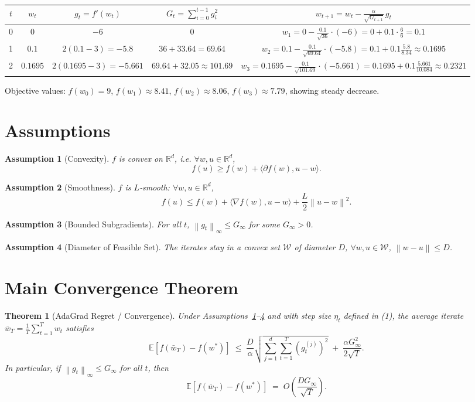 \documentclass[11pt]{article}
\newtheorem{theorem}{Theorem}
\newtheorem{assumption}{Assumption}
\newcommand{\E}{\mathbb{E}}
\newcommand{\R}{\mathbb{R}}
\newcommand{\norm}[1]{\left\| #1 \right\|}
\newcommand{\inner}[2]{\langle #1,#2\rangle}
\begin{document}
\begin{center}
\begin{tabular}{c|c|c|c|c}
$t$ & $w_{t}$ & $g_{t}=f'(w_{t})$ & $G_{t}= \sum_{i=0}^{t-1} g_{i}^{2}$ & $w_{t+1}=w_{t}-\frac{\alpha}{\sqrt{G_{t+1}}}\,g_{t}$\\ \hline
0 & $0$ & $-6$ & $0$ & $w_{1}=0-\frac{0.1}{\sqrt{36}}\cdot(-6)=0+0.1\cdot\frac{6}{6}=0.1$\\
1 & $0.1$ & $2(0.1-3)=-5.8$ & $36+33.64=69.64$ & $w_{2}=0.1-\frac{0.1}{\sqrt{69.64}}\cdot(-5.8)
      =0.1+0.1\frac{5.8}{8.34}\approx0.1695$\\
2 & $0.1695$ & $2(0.1695-3)=-5.661$ & $69.64+32.05\approx101.69$ &
 $w_{3}=0.1695-\frac{0.1}{\sqrt{101.69}}\cdot(-5.661)
      =0.1695+0.1\frac{5.661}{10.084}\approx0.2321$
\end{tabular}
\end{center}
Objective values: $f(w_{0})=9$, $f(w_{1})\approx8.41$, $f(w_{2})\approx8.06$, $f(w_{3})\approx7.79$, showing steady decrease.

\section*{Assumptions}
\begin{assumption}[Convexity]\label{ass:conv}
$f$ is convex on $\R^{d}$, i.e. $\forall w,u\in\R^{d}$,
\[
f(u)\ge f(w)+\inner{\partial f(w)}{u-w}.
\]
\end{assumption}
\begin{assumption}[Smoothness]\label{ass:smooth}
$f$ is $L$‑smooth: $\forall w,u\in\R^{d}$,
\[
f(u)\le f(w)+\inner{\nabla f(w)}{u-w}+\frac{L}{2}\norm{u-w}^{2}.
\]
\end{assumption}
\begin{assumption}[Bounded Subgradients]\label{ass:bound}
For all $t$, $\norm{g_{t}}_{\infty}\le G_{\infty}$ for some $G_{\infty}>0$.
\end{assumption}
\begin{assumption}[Diameter of Feasible Set]\label{ass:diam}
The iterates stay in a convex set $\mathcal{W}$ of diameter $D$,
$\forall w,u\in\mathcal{W}$, $\norm{w-u}\le D$.
\end{assumption}

\section*{Main Convergence Theorem}
\begin{theorem}[AdaGrad Regret / Convergence]\label{thm:adagrad}
Under Assumptions~\ref{ass:conv}–\ref{ass:diam} and with step size $\eta_{t}$ defined in (1), the average iterate $\bar w_{T}=\frac1T\sum_{t=1}^{T}w_{t}$ satisfies
\[
\E\!\left[f(\bar w_{T})-f(w^{*})\right]\;\le\;
\frac{D}{\alpha}\sqrt{\sum_{j=1}^{d} \sum_{t=1}^{T} (g_{t}^{(j)})^{2}}
\;+\;\frac{\alpha G_{\infty}^{2}}{2\sqrt{T}} .
\tag{2}
\]
In particular, if $\norm{g_{t}}_{\infty}\le G_{\infty}$ for all $t$, then
\[
\E\!\left[f(\bar w_{T})-f(w^{*})\right]\;=\;O\!\left(\frac{DG_{\infty}}{\sqrt{T}}\right).
\]
\end{theorem}
\end{document}
